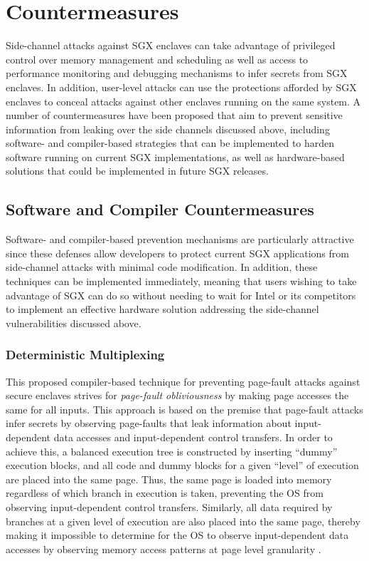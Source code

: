 \section{Countermeasures}

Side-channel attacks against SGX enclaves can take advantage of privileged control over memory management and scheduling as well as access to performance monitoring and debugging mechanisms to infer secrets from SGX enclaves. In addition, user-level attacks can use the protections afforded by SGX enclaves to conceal attacks against other enclaves running on the same system. A number of countermeasures have been proposed that aim to prevent sensitive information from leaking over the side channels discussed above, including software- and compiler-based strategies that can be implemented to harden software running on current SGX implementations, as well as hardware-based solutions that could be implemented in future SGX releases.

\subsection{Software and Compiler Countermeasures}

Software- and compiler-based prevention mechanisms are particularly attractive since these defenses allow developers to protect current SGX applications from side-channel attacks with minimal code modification. In addition, these techniques can be implemented immediately, meaning that users wishing to take advantage of SGX can do so without needing to wait for Intel or its competitors to implement an effective hardware solution addressing the side-channel vulnerabilities discussed above.

\subsubsection{Deterministic Multiplexing}

This proposed compiler-based technique for preventing page-fault attacks against secure enclaves strives for \emph{page-fault obliviousness} by making page accesses the same for all inputs. This approach is based on the premise that page-fault attacks infer secrets by observing page-faults that leak information about input-dependent data accesses and input-dependent control transfers. In order to achieve this, a balanced execution tree is constructed by inserting ``dummy'' execution blocks, and all code and dummy blocks for a given ``level'' of execution are placed into the same page. Thus, the same page is loaded into memory regardless of which branch in execution is taken, preventing the OS from observing input-dependent control transfers. Similarly, all data required by branches at a given level of execution are also placed into the same page, thereby making it impossible to determine for the OS to observe input-dependent data accesses by observing memory access patterns at page level granularity \cite{shinde_preventing_2015}. 

